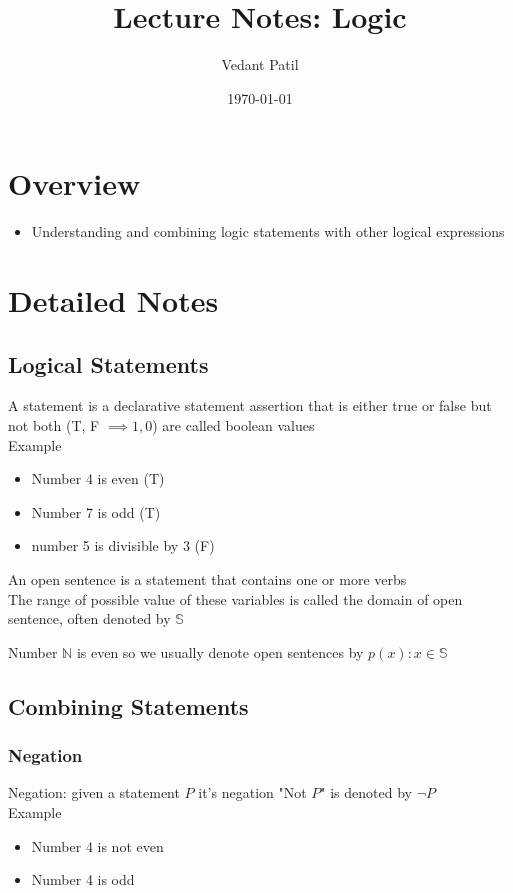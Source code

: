 \documentclass[12pt,a4paper]{article}
\title{Lecture Notes: Logic}
\author{Vedant Patil}
\date{\today}
\begin{document}
\maketitle

\section{Overview}
\begin{tcolorbox}[colback=yellow!10!white,colframe=yellow!50!black,title=Key Points]
  \begin{itemize}
    \item Understanding and combining logic statements with other logical expressions 
  \end{itemize}
\end{tcolorbox}

\section{Detailed Notes}
\subsection{Logical Statements}
A statement is a declarative statement assertion that is either true or false but not both (T, F \( \implies 1,0 \)) are called boolean values \\ 

Example 

\begin{itemize}
  \item Number 4 is even (T) 
  \item Number 7 is odd (T) 
  \item number 5 is divisible by 3 (F) 
\end{itemize}

An open sentence is a statement that contains one or more verbs \\ 

The range of possible value of these variables is called the domain of open sentence, often denoted by \( \mathbb{S} \)

Number \( \mathbb{N} \) is even so we usually denote open sentences by \( p(x) : x \in \mathbb{S} \)

\subsection{Combining Statements}
\subsubsection{Negation}
Negation: given a statement \( P \) it's negation "Not \( P \)" is denoted by \( \neg P \) \\ 
Example 
\begin{itemize}
  \item Number 4 is not even 
  \item Number 4 is odd 
\end{itemize}
\end{document}
